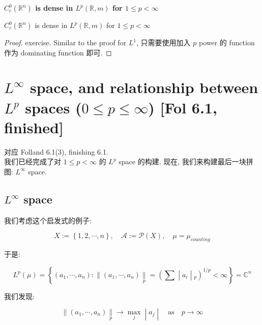 \documentclass{qlnotes-export}
\begin{document}
\begin{theorem}{\protect{}\label{kn-density-of-compactly-supported-continuous-functions-in-lp}{\textbf{\(C_{c}^{0}({\mathbb{R}}^{n})\)
is dense in \(L^{p}({\mathbb{R}},m)\) for \(1 \leq p < \infty\)}}}

\(C_{c}^{0}({\mathbb{R}}^{n})\) is dense in \(L^{p}({\mathbb{R}},m)\) for \(1 \leq p < \infty\)

\end{theorem}

\begin{proof}

exercise. Similar to the proof for \(L^{1}\), 只需要使用加入 \(p\) power 的 function 作为 dominating function 即可.

\end{proof}

\section{\texorpdfstring{\(L^{\infty}\) space, and relationship between \(L^{p}\) spaces (\(0 \leq p \leq \infty\)) {[}Fol 6.1, finished{]}}{L\^{}\{\textbackslash infty\} space, and relationship between L\^{}\{p\} spaces (0 \textbackslash leq p \textbackslash leq \textbackslash infty) {[}Fol 6.1, finished{]}}}

对应 Folland 6.1(3), finishing 6.1.\\
我们已经完成了对 \(1 \leq p < \infty\) 的 \(L^{p}\) space 的构建. 现在, 我们来构建最后一块拼图: \(L^{\infty}\) space.

\subsection{\texorpdfstring{\(L^{\infty}\) space}{L\^{}\{\textbackslash infty\} space}}\label{linfty-space}

我们考虑这个启发式的例子:

\[X := \left\{ {1,2,\cdots,n} \right\},\quad\mathcal{A} := \mathcal{P}(X),\quad\mu = \mu_{counting}\]

于是:

\[L^{p}(\mu) = \left\{ (a_{1},\cdots,a_{n}): \parallel (a_{1},\cdots,a_{n})\underset{p}{\parallel} = (\sum \middle| a_{i} \middle| {}_{p})^{1/p} < \infty \right\} = {\mathbb{C}}^{n}\]

我们发现:

\[\left. \parallel (a_{1},\cdots,a_{n})\underset{p}{\parallel}\rightarrow\max\limits_{j} \middle| a_{j} \middle| \quad\text{as}\quad p\rightarrow\infty \right.\]
\end{document}

